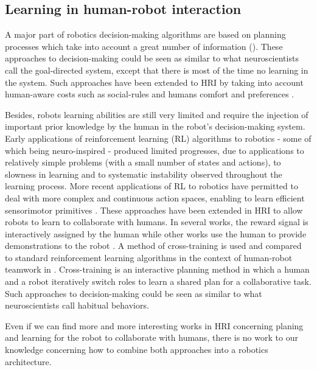 \documentclass[english,a4paper,11pt,twoside]{StyleThese}
\begin{document}
\subsection{Learning in human-robot interaction}

A major part of robotics decision-making algorithms are based on planning processes which take into account a great number of information (\cite{ingrand2014deliberation}). These approaches to decision-making could be seen as similar to what neuroscientists call the goal-directed system, except that there is most of the time no learning in the system. Such approaches have been extended to HRI by taking into account human-aware costs such as social-rules and humans comfort and preferences \cite{cirillo2010human,Lallement2014hatp}.

Besides, robots learning abilities are still very limited and require the injection of important prior knowledge by the human in the robot’s decision-making system. Early applications of reinforcement learning (RL) algorithms to robotics \cite{hayes1994robot, morimoto2001acquisition, smart2002effective} - some of which being neuro-inspired - produced limited progresses, due to applications to relatively simple problems (with a small number of states and actions), to slowness in learning and to systematic instability observed throughout the learning process. More recent applications of RL to robotics have permitted to deal with more complex and continuous action spaces, enabling to learn efficient sensorimotor primitives \cite{kober2011learning, martins2010learning, stulp2013robot}. These approaches have been extended in HRI to allow robots to learn to collaborate with humans.
In several works, the reward signal is interactively assigned by the human \cite{kaplan2002robotic, knox2012reinforcement} while other works use the human to provide demonstrations to the robot \cite{nicolescu2003natural, thomaz2006reinforcement}.
A method of cross-training is used and compared to standard reinforcement learning algorithms in the context of human-robot teamwork in \cite{nikolaidis2013human}. Cross-training is an interactive planning method in which a human and a robot iteratively switch roles to learn a shared plan for a collaborative task. Such approaches to decision-making could be seen as similar to what neuroscientists call habitual behaviors.

Even if we can find more and more interesting works in HRI concerning planing and learning for the robot to collaborate with humans, there is no work to our knowledge concerning how to combine both approaches into a robotics architecture.
\end{document}
